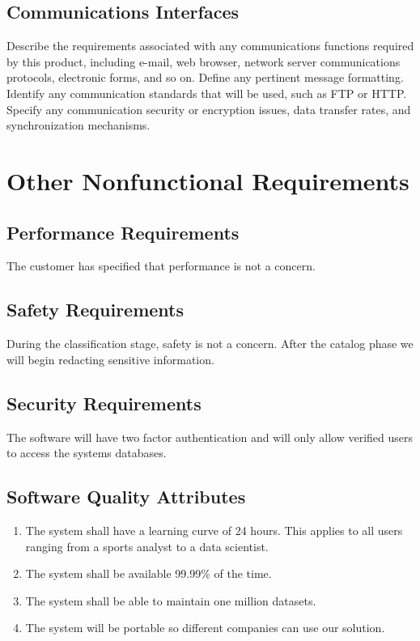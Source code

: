 \documentclass[12pt,oneside,letterpaper]{article}
\begin{document}
\subsection{Communications Interfaces}
Describe the requirements associated with any communications functions required by this product, including e-mail, web browser, network server communications protocols, electronic forms, and so on. Define any pertinent message formatting. Identify any communication standards that will be used, such as FTP or HTTP. Specify any communication security or encryption issues, data transfer rates, and synchronization mechanisms.

\section{Other Nonfunctional Requirements}
\subsection{Performance Requirements}
The customer has specified that performance is not a concern.
\subsection{Safety Requirements}
During the classification stage, safety is not a concern. After the catalog phase we will begin redacting sensitive information.
\subsection{Security Requirements}
The software will have two factor authentication and will only allow verified users to access the systems databases.
\subsection{Software Quality Attributes}
\begin{enumerate}
    \item The system shall have a learning curve of 24 hours. This applies to all users ranging from a sports analyst to a data scientist.
    \item The system shall be available 99.99\% of the time.
    \item The system shall be able to maintain one million datasets.
    \item The system will be portable so different companies can use our solution.
\end{enumerate}
\end{document}
